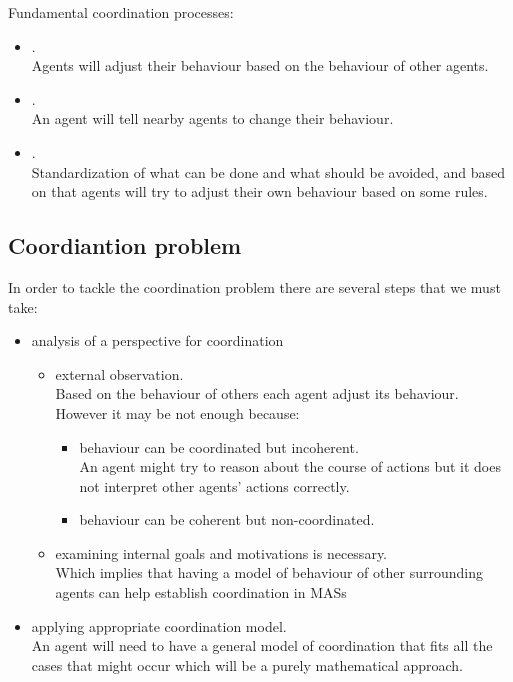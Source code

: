 Fundamental coordination processes:
\begin{itemize}
\item {}.\\
Agents will adjust their behaviour based on the behaviour of other agents.
\item {}.\\
An agent will tell nearby agents to change their behaviour.
\item {}.\\
Standardization of what can be done and what should be avoided, and based on that agents will try to adjust their own behaviour based on some rules.
\end{itemize}

\subsection{Coordiantion problem}
In order to tackle the coordination problem there are several steps that we must take:
\begin{itemize}
\item analysis of a perspective for coordination
\begin{itemize}
\item external observation.\\
Based on the behaviour of others each agent adjust its behaviour. However it may be not enough because:
\begin{itemize}
\item behaviour can be coordinated but incoherent.\\
An agent might try to reason about the course of actions but it does not interpret other agents' actions correctly.
\item behaviour can be coherent but non-coordinated.
\end{itemize}
\item examining internal goals and motivations is necessary.\\
Which implies that having a model of behaviour of other surrounding agents can help establish coordination in MASs
\end{itemize}
\item applying appropriate coordination model.\\
An agent will need to have a general model of coordination that fits all the cases that might occur which will be a purely mathematical approach. 
\end{itemize}

